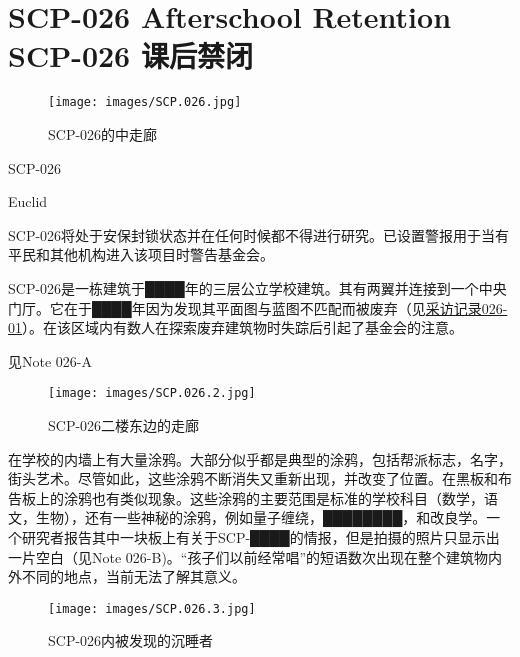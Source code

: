 \chapter[SCP-026 课后禁闭]{
    SCP-026 Afterschool Retention\\
    SCP-026 课后禁闭
}

\label{chap:SCP-026}

\begin{figure}[H]
    \centering
    \texttt{[image: images/SCP.026.jpg]}
    \caption*{SCP-026的中走廊}
\end{figure}

SCP-026

Euclid

SCP-026将处于安保封锁状态并在任何时候都不得进行研究。已设置警报用于当有平民和其他机构进入该项目时警告基金会。

SCP-026是一栋建筑于████年的三层公立学校建筑。其有两翼并连接到一个中央门厅。它在于████年因为发现其平面图与蓝图不匹配而被废弃（见\hyperref[sec:DOC-interview-log-026-01]{采访记录026-01}）。在该区域内有数人在探索废弃建筑物时失踪后引起了基金会的注意。


见Note 026-A

\begin{figure}[H]
    \centering
    \texttt{[image: images/SCP.026.2.jpg]}
    \caption*{SCP-026二楼东边的走廊}
\end{figure}

在学校的内墙上有大量涂鸦。大部分似乎都是典型的涂鸦，包括帮派标志，名字，街头艺术。尽管如此，这些涂鸦不断消失又重新出现，并改变了位置。在黑板和布告板上的涂鸦也有类似现象。这些涂鸦的主要范围是标准的学校科目（数学，语文，生物），还有一些神秘的涂鸦，例如量子缠绕，████████，和改良学。一个研究者报告其中一块板上有关于SCP-████的情报，但是拍摄的照片只显示出一片空白（见Note 026-B)。“孩子们以前经常唱”的短语数次出现在整个建筑物内外不同的地点，当前无法了解其意义。

\begin{figure}[H]
    \centering
    \texttt{[image: images/SCP.026.3.jpg]}
    \caption*{SCP-026内被发现的沉睡者}
\end{figure}


